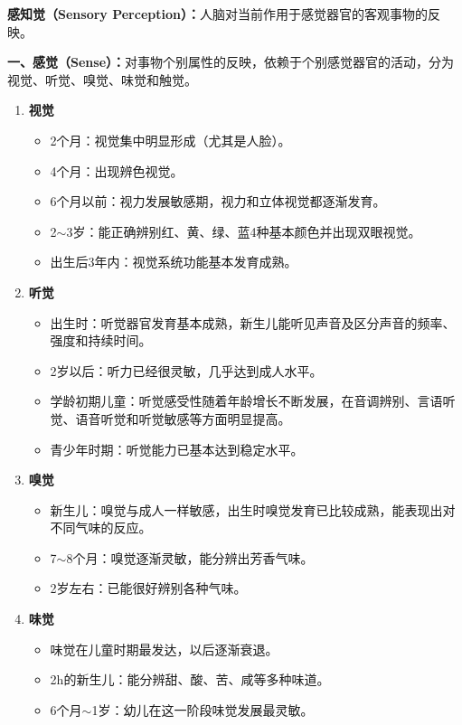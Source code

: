 \begin{keybox}
\textbf{感知觉（Sensory Perception）：}人脑对当前作用于感觉器官的客观事物的反映。

\textbf{一、感觉（Sense）：}对事物个别属性的反映，依赖于个别感觉器官的活动，分为视觉、听觉、嗅觉、味觉和触觉。

\begin{enumerate}[leftmargin=*]
    \item \textbf{视觉}
    \begin{itemize}[leftmargin=*]
        \item 2个月：视觉集中明显形成（尤其是人脸）。
        \item 4个月：出现辨色视觉。
        \item 6个月以前：视力发展敏感期，视力和立体视觉都逐渐发育。
        \item 2$\sim$3岁：能正确辨别红、黄、绿、蓝4种基本颜色并出现双眼视觉。
        \item 出生后3年内：视觉系统功能基本发育成熟。
    \end{itemize}

    \item \textbf{听觉}
    \begin{itemize}[leftmargin=*]
        \item 出生时：听觉器官发育基本成熟，新生儿能听见声音及区分声音的频率、强度和持续时间。
        \item 2岁以后：听力已经很灵敏，几乎达到成人水平。
        \item 学龄初期儿童：听觉感受性随着年龄增长不断发展，在音调辨别、言语听觉、语音听觉和听觉敏感等方面明显提高。
        \item 青少年时期：听觉能力已基本达到稳定水平。
    \end{itemize}

    \item \textbf{嗅觉}
    \begin{itemize}[leftmargin=*]
        \item 新生儿：嗅觉与成人一样敏感，出生时嗅觉发育已比较成熟，能表现出对不同气味的反应。
        \item 7$\sim$8个月：嗅觉逐渐灵敏，能分辨出芳香气味。
        \item 2岁左右：已能很好辨别各种气味。
    \end{itemize}

    \item \textbf{味觉}
    \begin{itemize}[leftmargin=*]
        \item 味觉在儿童时期最发达，以后逐渐衰退。
        \item 2h的新生儿：能分辨甜、酸、苦、咸等多种味道。
        \item 6个月$\sim$1岁：幼儿在这一阶段味觉发展最灵敏。
    \end{itemize}


\end{enumerate}
\end{keybox}
